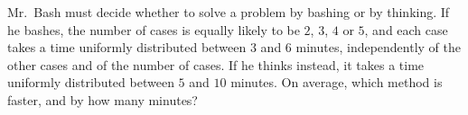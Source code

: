 Mr.\ Bash must decide whether to solve a problem by bashing or by thinking. If he bashes, the number of cases is equally likely to be $2$, $3$, $4$ or $5$, and each case takes a time uniformly distributed between $3$ and $6$ minutes, independently of the other cases and of the number of cases. If he thinks instead, it takes a time uniformly distributed between $5$ and $10$ minutes. On average, which method is faster, and by how many minutes?
